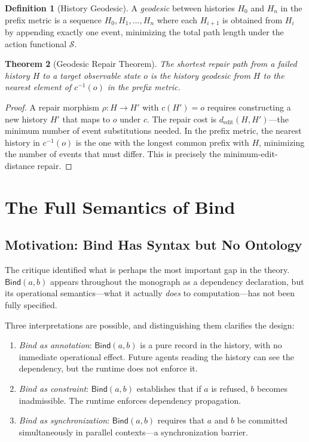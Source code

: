 \documentclass[12pt, a4paper, openany]{book}
\theoremstyle{plain}
\newtheorem{theorem}{Theorem}[chapter]
\theoremstyle{definition}
\newtheorem{definition}[theorem]{Definition}
\theoremstyle{remark}
\newcommand{\Bind}{\mathsf{Bind}}
\begin{document}
\begin{definition}[History Geodesic]
A \emph{geodesic} between histories $H_0$ and $H_n$ in the prefix metric
is a sequence $H_0, H_1, \ldots, H_n$ where each $H_{i+1}$ is obtained
from $H_i$ by appending exactly one event, minimizing the total path length
under the action functional $\mathcal{S}$.
\end{definition}

\begin{theorem}[Geodesic Repair Theorem]
The shortest repair path from a failed history $H$ to a target observable state
$o$ is the history geodesic from $H$ to the nearest element of $c^{-1}(o)$
in the prefix metric.
\end{theorem}

\begin{proof}
A repair morphism $\rho : H \to H'$ with $c(H') = o$ requires constructing
a new history $H'$ that maps to $o$ under $c$. The repair cost is
$d_{\mathrm{edit}}(H, H')$---the minimum number of event substitutions needed.
In the prefix metric, the nearest history in $c^{-1}(o)$ is the one with
the longest common prefix with $H$, minimizing the number of events that must
differ. This is precisely the minimum-edit-distance repair.
\end{proof}

\chapter{The Full Semantics of Bind}

\section{Motivation: Bind Has Syntax but No Ontology}

The critique identified what is perhaps the most important gap in the theory.
$\Bind(a, b)$ appears throughout the monograph as a dependency declaration,
but its operational semantics---what it actually \emph{does} to computation---has
not been fully specified.

Three interpretations are possible, and distinguishing them clarifies the design:

\begin{enumerate}
\item \emph{Bind as annotation}: $\Bind(a, b)$ is a pure record in the history,
with no immediate operational effect. Future agents reading the history can see
the dependency, but the runtime does not enforce it.
\item \emph{Bind as constraint}: $\Bind(a, b)$ establishes that if $a$ is refused,
$b$ becomes inadmissible. The runtime enforces dependency propagation.
\item \emph{Bind as synchronization}: $\Bind(a, b)$ requires that $a$ and $b$
be committed simultaneously in parallel contexts---a synchronization barrier.
\end{enumerate}
\end{document}
